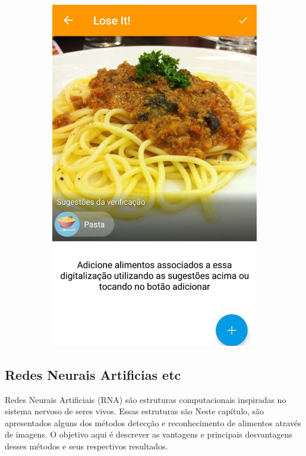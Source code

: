 \begin{figure}[!ht]
\begin{subfigure}{0.4\textwidth}
  \includegraphics[width=\textwidth]{imgs/loseit.jpeg}
  \label{fig:subApps2}
\end{subfigure}

\label{fig:test}
\end{figure}


\subsection{Redes Neurais Artificias etc \label{subsec:nn}}

Redes Neurais Artificiais (RNA) são estruturas computacionais inspiradas no sistema nervoso de seres vivos. Essas estruturas são 
Neste capítulo, são apresentados alguns dos métodos detecção e reconhecimento de alimentos através de imagens. O objetivo aqui é descrever as vantagens e principais desvantagens desses métodos e seus respectivos resultados. 


